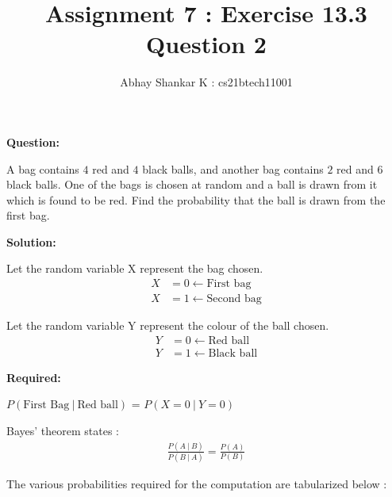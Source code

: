 \documentclass[journal,12pt,twocolumn]{IEEEtran}
\begin{document}
	\title{Assignment 7 : Exercise 13.3 Question 2}
		\author{ Abhay Shankar K : cs21btech11001}

		\maketitle

		\bigskip

	\providecommand{\brak}[1]{\ensuremath{\left(#1\right)}}
	\providecommand{\sbrak}[1]{\ensuremath{\left[#1\right]}}
	\providecommand{\cbrak}[1]{\ensuremath{\left\{#1\right\}}}
	\newcommand{\solution}{\noindent \textbf{Solution: }}
	\newcommand{\question}{\noindent \textbf{Question: }}
	\newcommand{\req}{\noindent \textbf{Required: }}
	\providecommand{\rpr}[2]{\ensuremath{P_{#1}\left(#2\right)}} %
	\providecommand{\spr}[1]{\ensuremath{P\left(#1\right)}} %
	\providecommand{\cpr}[2]{\ensuremath{\spr{#1\ |\ #2}}} %
	
	
	\question
	
	
	A bag contains $4$ red and $4$ black balls, and another bag contains $2$ red and $6$ black balls. One of the bags is chosen at random and a ball is drawn from it which is found to be red. Find the probability that the ball is drawn from the first bag.
	
	
	\solution
	
	
	Let the random variable X represent the bag chosen.
	\begin{align}
		X &= 0 \leftarrow \text{First bag} \nonumber \\
		X &= 1 \leftarrow \text{Second bag}
			\label{Xrange}
	\end{align}
	
	
	Let the random variable Y represent the colour of the ball chosen.
	\begin{align}
		Y &= 0 \leftarrow \text{Red ball} \nonumber \\
		Y &= 1 \leftarrow \text{Black ball}
			\label{Yrange}
	\end{align}


	\req 
	
	\raggedright \cpr{\text{First Bag}}{\text{Red ball}} = \cpr{X = 0}{Y = 0}
	
	
	Bayes' theorem states :
	\begin{align}
		\frac{\cpr{A}{B}}{\cpr{B}{A}} = \frac{\spr{A}}{\spr{B}} 
			\label{Bayes_thm}
	\end{align}
	
	
	The various probabilities required for the computation are tabularized below :
	
\end{document}
